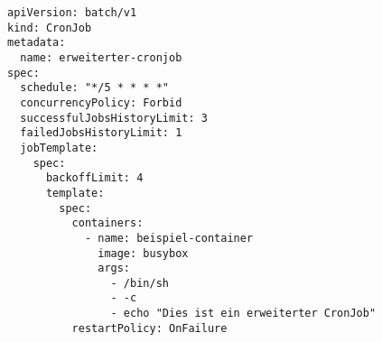 \begin{verbatim}
apiVersion: batch/v1
kind: CronJob
metadata:
  name: erweiterter-cronjob
spec:
  schedule: "*/5 * * * *"
  concurrencyPolicy: Forbid
  successfulJobsHistoryLimit: 3
  failedJobsHistoryLimit: 1
  jobTemplate:
    spec:
      backoffLimit: 4
      template:
        spec:
          containers:
            - name: beispiel-container
              image: busybox
              args:
                - /bin/sh
                - -c
                - echo "Dies ist ein erweiterter CronJob"
          restartPolicy: OnFailure
\end{verbatim}